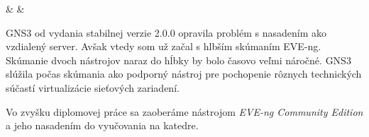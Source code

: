 \begin{longtabu}
                                   &                                                                                                                                                                                                                                                &                                                                                                            \\ \hline
\end{longtabu}

GNS3 od vydania stabilnej verzie 2.0.0 opravila problém s nasadením ako vzdialený server. Avšak vtedy som už začal s hlbším skúmaním EVE-ng. Skúmanie dvoch nástrojov naraz do hĺbky by bolo časovo veľmi náročné. GNS3 slúžila počas skúmania ako podporný nástroj pre pochopenie rôznych technických súčastí virtualizácie sieťových zariadení.

Vo zvyšku diplomovej práce sa zaoberáme nástrojom \emph{EVE-ng Community Edition} a jeho nasadením do vyučovania na katedre.
